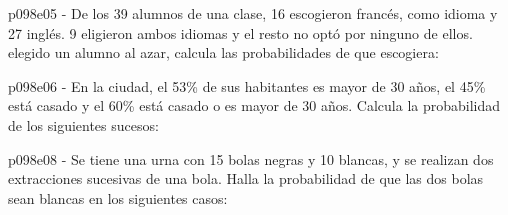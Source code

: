 \documentclass[spanish, 11pt]{exam}
\begin{document}
        \begin{questions}
        \question p098e05 - De los 39 alumnos de una clase, 16 escogieron francés, como idioma y 27 inglés. 9 eligieron ambos idiomas y
el resto no optó por ninguno de ellos. elegido un alumno al azar, calcula las probabilidades de que escogiera:

        \begin{multicols}{2}
        \end{multicols}
        \question p098e06 - En la ciudad, el 53\% de sus habitantes es mayor de 30 años, el 45\% está
casado y el 60\% está casado o es mayor de 30 años. 
Calcula la probabilidad de los siguientes sucesos:
        \begin{multicols}{2}
        \end{multicols}
        \question p098e08 - Se tiene una urna con 15 bolas negras y 10 blancas, y se realizan dos extracciones 
sucesivas de una bola. 
Halla la probabilidad de que las dos bolas sean blancas en los siguientes casos:
        \begin{multicols}{2}
\end{multicols}
\end{questions}
\end{document}
